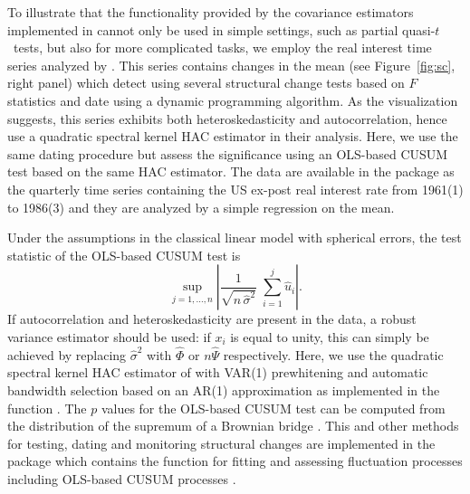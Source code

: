\documentclass{Z}
\begin{document}
To illustrate that the functionality provided by the covariance estimators implemented
in  cannot only be used in simple settings, such as partial quasi-$t$~tests,
but also for more complicated tasks, we employ the real interest time series analyzed
by \cite{hac:Bai+Perron:2003}. This series contains changes in the mean (see Figure~\ref{fig:sc},
right panel) which \cite{hac:Bai+Perron:2003} detect using several structural change tests
based on $F$ statistics and date using a dynamic programming algorithm. As the visualization suggests,
this series exhibits both heteroskedasticity and autocorrelation, hence \cite{hac:Bai+Perron:2003}
use a quadratic spectral kernel HAC estimator in their analysis.
Here, we use the same dating procedure but assess the significance using an OLS-based CUSUM test
\citep{hac:Ploberger+Kraemer:1992} based on the same HAC estimator.
The data are available in the package  as the quarterly time series
 containing the US ex-post real interest rate from 1961(1) to 1986(3)
and they are analyzed by a simple regression on the mean.

Under the assumptions in the classical linear model with spherical errors, the 
test statistic of the OLS-based CUSUM test is
\begin{equation}
\sup_{j = 1, \dots, n} \left| \frac{1}{\sqrt{n \, \hat \sigma^2}} \; \sum_{i = 1}^{j} \hat u_i  \right|.
\end{equation}
If autocorrelation and heteroskedasticity are present in the data, a robust variance estimator
should be used: if $x_i$ is equal to unity, this can simply be
achieved by replacing $\hat \sigma^2$ with $\hat \Phi$ or $n \hat \Psi$ respectively. Here,
we use the quadratic spectral kernel HAC estimator of \cite{hac:Andrews:1991}
with VAR(1) prewhitening and automatic bandwidth selection based on an AR(1) approximation as
implemented in the function . The $p$ values
for the OLS-based CUSUM test can be computed from the distribution of the supremum of a Brownian bridge
\citep[see e.g.,][]{hac:Ploberger+Kraemer:1992}. This and other methods for testing, dating and 
monitoring structural changes are implemented in the  package 
\citep{hac:Zeileis+Leisch+Hornik:2002} which contains the function  for 
fitting and assessing fluctuation processes including OLS-based CUSUM processes
\citep[see][for more details]{hac:Zeileis:2004}.
\end{document}
